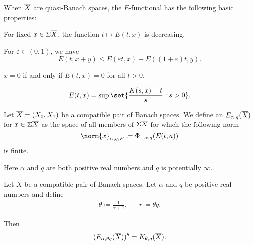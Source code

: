 \begin{proposition}\label{thm:def:e_functional}
  When \( \oline{X} \) are quasi-Banach spaces, the \hyperref[def:e_functional]{\( E \)-functional} has the following basic properties:

  \begin{thmenum}
     For fixed \( x \in \Sigma\oline{X} \), the function \( t \mapsto E(t, x) \) is decreasing.

     For \( \varepsilon \in (0, 1) \), we have
    \begin{equation*}
      E(t, x + y) \leq E(\varepsilon t, x) + E((1 + \varepsilon) t, y).
    \end{equation*}

     \( x = 0 \) if and only if \( E(t, x) = 0 \) for all \( t > 0 \).

    \begin{equation*}
      E(t, x) = \sup \set{ \frac {K(s, x) - t} s : s > 0 }.
    \end{equation*}
  \end{thmenum}
\end{proposition}

\begin{definition}\label{def:approximation_space}
  Let \( \oline{X} = (X_0, X_1) \) be a compatible pair of Banach spaces. We define an  \( E_{\alpha,q}(\oline{X}) \) for \( x \in \Sigma\oline{X} \) as the space of all members of \( \Sigma\oline{X} \) for which the following norm
  \begin{equation}\label{eq:def:approximation_space/norm}
    \norm{x}_{\alpha,q,E} \coloneqq \Phi_{-\alpha,q}(E(t,a))
  \end{equation}
  is finite.

  Here \( \alpha \) and \( q \) are both positive real numbers and \( q \) is potentially \( \infty \).
\end{definition}

\begin{theorem}\label{thm:interpolation_space_and_approximation_space}
  Let \( X \) be a compatible pair of Banach spaces. Let \( \alpha \) and \( q \) be positive real numbers and define
  \begin{align*}
    \theta \coloneqq \frac 1 {\alpha + 1},
    &&
    r \coloneqq \theta q.
  \end{align*}

  Then
  \begin{equation*}
    (E_{\alpha,\theta q}(\oline{X}))^\theta = K_{\theta,q}(\oline{X}).
  \end{equation*}
\end{theorem}

